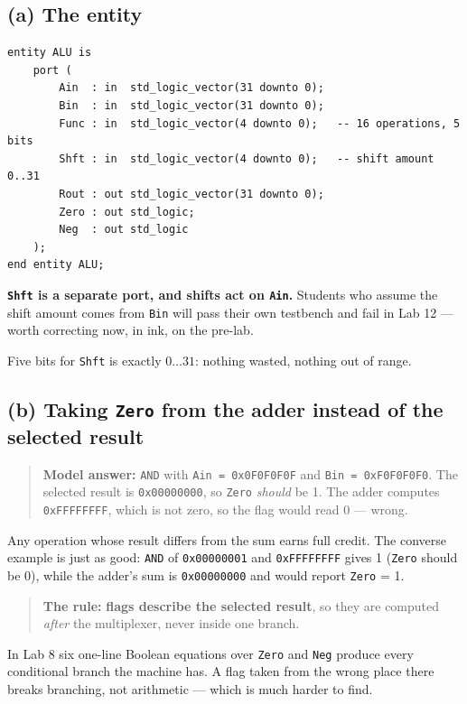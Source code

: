\documentclass[11pt]{article}
\newcommand{\code}[1]{\texttt{#1}}
\begin{document}
\subsection*{(a) The entity}

\begin{lstlisting}
entity ALU is
    port (
        Ain  : in  std_logic_vector(31 downto 0);
        Bin  : in  std_logic_vector(31 downto 0);
        Func : in  std_logic_vector(4 downto 0);   -- 16 operations, 5 bits
        Shft : in  std_logic_vector(4 downto 0);   -- shift amount 0..31
        Rout : out std_logic_vector(31 downto 0);
        Zero : out std_logic;
        Neg  : out std_logic
    );
end entity ALU;
\end{lstlisting}

\textbf{\code{Shft} is a separate port, and shifts act on \code{Ain}.} Students
who assume the shift amount comes from \code{Bin} will pass their own testbench
and fail in Lab 12 --- worth correcting now, in ink, on the pre-lab.

Five bits for \code{Shft} is exactly $0 \ldots 31$: nothing wasted, nothing out of
range.

\subsection*{(b) Taking \code{Zero} from the adder instead of the selected result}

\begin{quote}
\textbf{Model answer:} \code{AND} with \code{Ain = 0x0F0F0F0F} and
\code{Bin = 0xF0F0F0F0}. The selected result is \code{0x00000000}, so \code{Zero}
\emph{should} be 1. The adder computes \code{0xFFFFFFFF}, which is not zero, so
the flag would read 0 --- wrong.
\end{quote}

Any operation whose result differs from the sum earns full credit. The converse
example is just as good: \code{AND} of \code{0x00000001} and \code{0xFFFFFFFF}
gives 1 (\code{Zero} should be 0), while the adder's sum is \code{0x00000000} and
would report \code{Zero} = 1.

\begin{quote}
\textbf{The rule:} \textbf{flags describe the selected result}, so they are
computed \emph{after} the multiplexer, never inside one branch.
\end{quote}

In Lab 8 six one-line Boolean equations over \code{Zero} and \code{Neg} produce
every conditional branch the machine has. A flag taken from the wrong place there
breaks branching, not arithmetic --- which is much harder to find.
\end{document}
